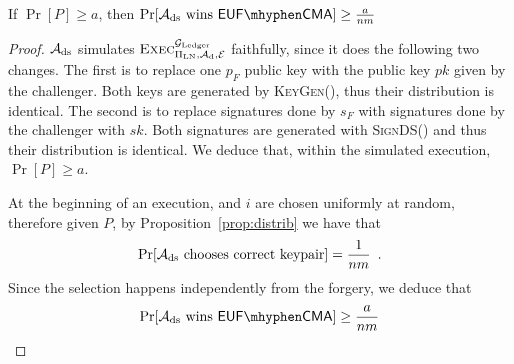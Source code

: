   \begin{proposition}
  \label{prop:forgery:ds}
    If $\Pr[P] \geq a$, then $\Pr[\adversary_{\mathrm{ds}} \text{ wins }
    \mathsf{EUF \mhyphen CMA}] \geq \frac{a}{nm}$
  \end{proposition}

  \begin{proof}
    $\mathcal{A}_{\mathrm{ds}}$ simulates
    $\textsc{Exec}^{\mathcal{G}_{\mathrm{Ledger}}}_{\Pi_{\mathrm{LN}}, \mathcal{A}_{\mathrm{d}},
    \mathcal{E}}$ faithfully, since it does the following two changes. The
    first is to replace one $p_F$ public key with the public key $pk$ given by
    the challenger. Both keys are generated by \textsc{KeyGen}(), thus their
    distribution is identical. The second is to replace signatures done by $s_F$
    with signatures done by the challenger with $sk$. Both signatures are
    generated with \textsc{SignDS}() and thus their distribution is identical.
    We deduce that, within the simulated execution, $\Pr[P] \geq a$.

    At the beginning of an execution, \alice{} and $i$ are chosen uniformly at
    random, therefore given $P$, by Proposition~\ref{prop:distrib} we have that
    \begin{equation*}
      \Pr[\mathcal{A}_{\mathrm{ds}} \text{ chooses correct keypair}] =
      \frac{1}{nm} \enspace.
    \end{equation*}
    Since the selection happens independently from the forgery, we deduce that
    \begin{equation*}
      \Pr[\adversary_{\mathrm{ds}} \text{ wins } \mathsf{EUF \mhyphen CMA}] \geq
      \frac{a}{nm}
    \end{equation*}
  \end{proof}

